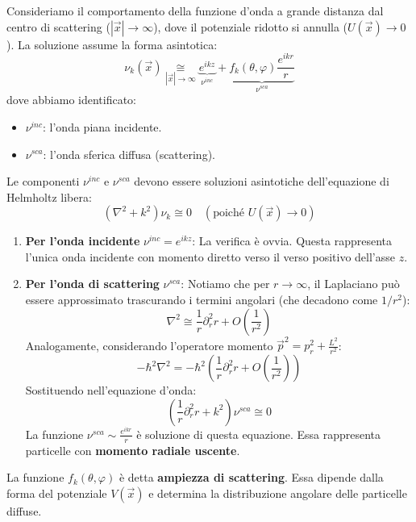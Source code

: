 Consideriamo il comportamento della funzione d'onda a grande distanza dal centro di scattering ($|\vec{x}| \to \infty$), dove il potenziale ridotto si annulla ($U(\vec{x}) \to 0$).
La soluzione assume la forma asintotica:
\begin{equation}
    \nu_k(\vec{x}) \underset{|\vec{x}|\to\infty}{\cong} \underbrace{e^{ikz}}_{\nu^{inc}} + \underbrace{f_k(\theta, \varphi) \frac{e^{ikr}}{r}}_{\nu^{sca}}
\end{equation}
dove abbiamo identificato:
\begin{itemize}
    \item $\nu^{inc}$: l'onda piana incidente.
    \item $\nu^{sca}$: l'onda sferica diffusa (scattering).
\end{itemize}
Le componenti $\nu^{inc}$ e $\nu^{sca}$ devono essere soluzioni asintotiche dell'equazione di Helmholtz libera:
\[
    \left( \nabla^2 + k^2 \right) \nu_k \cong 0 \quad (\text{poiché } U(\vec{x}) \to 0)
\]

\begin{enumerate}
    \item \textbf{Per l'onda incidente} $\nu^{inc} = e^{ikz}$:
    La verifica è ovvia. Questa rappresenta l'unica onda incidente con momento diretto verso il verso positivo dell'asse $z$.

    \item \textbf{Per l'onda di scattering} $\nu^{sca}$:
    Notiamo che per $r \to \infty$, il Laplaciano può essere approssimato trascurando i termini angolari (che decadono come $1/r^2$):
    \[
        \nabla^2 \cong \frac{1}{r}\partial_r^2 r + O\left(\frac{1}{r^2}\right)
    \]
    Analogamente, considerando l'operatore momento $\vec{p}^2 = p_r^2 + \frac{L^2}{r^2}$:
    \[
        -\hbar^2 \nabla^2 = -\hbar^2 \left( \frac{1}{r}\partial_r^2 r + O\left(\frac{1}{r^2}\right) \right)
    \]
    Sostituendo nell'equazione d'onda:
    \[
        \left( \frac{1}{r}\partial_r^2 r + k^2 \right) \nu^{sca} \cong 0
    \]
    La funzione $\nu^{sca} \sim \frac{e^{ikr}}{r}$ è soluzione di questa equazione. Essa rappresenta particelle con \textbf{momento radiale uscente}.
\end{enumerate}

\begin{definition}
    La funzione $f_k(\theta, \varphi)$ è detta \textbf{ampiezza di scattering}. Essa dipende dalla forma del potenziale $V(\vec{x})$ e determina la distribuzione angolare delle particelle diffuse.
\end{definition}


